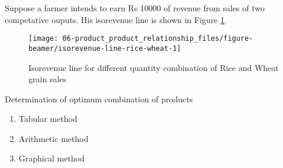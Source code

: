 \documentclass[12pt,ignorenonframetext,aspectratio=169]{beamer}
\providecommand{\tightlist}{%
  \setlength{\itemsep}{0pt}\setlength{\parskip}{0pt}}
\begin{document}
\begin{frame}{}
\protect\hypertarget{section-2}{}
Suppose a farmer intends to earn Rs 10000 of revenue from sales of two
competative ouputs. His isorevenue line is shown in Figure
\ref{fig:isorevenue-line-rice-wheat}.

\begin{figure}
\texttt{[image: 06-product\_product\_relationship\_files/figure-beamer/isorevenue-line-rice-wheat-1]} \caption{Isorevenue line for different quantity combination of Rice and Wheat grain sales}\label{fig:isorevenue-line-rice-wheat}
\end{figure}
\end{frame}

\begin{frame}{Determination of optimum combination of products}
\protect\hypertarget{determination-of-optimum-combination-of-products}{}
\begin{enumerate}
\tightlist
\item
  Tabular method
\item
  Arithmetic method
\item
  Graphical method
\end{enumerate}
\end{frame}
\end{document}
